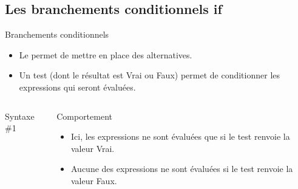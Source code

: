\subsection{Les branchements conditionnels if}
\begin{frame}{}
	\begin{block}{Branchements conditionnels}
		\begin{itemize}
			\item Le  permet de mettre en place des alternatives.
			\item Un test (dont le résultat est Vrai ou Faux) permet de conditionner les expressions qui seront évaluées.
		\end{itemize}
	\end{block}\vrule
	\begin{columns}
		\begin{column}{6cm}
			\begin{block}{Syntaxe \#1}
			\end{block}
		\end{column}
		\begin{column}{5cm}
			\begin{block}{Comportement}
				\begin{itemize}
					\item Ici, les expressions ne sont évaluées que si le test renvoie la valeur Vrai.\\
					\item Aucune des expressions ne sont évaluées si le test renvoie la valeur Faux.
				\end{itemize}
			\end{block}
		\end{column}
	\end{columns}
\end{frame}

